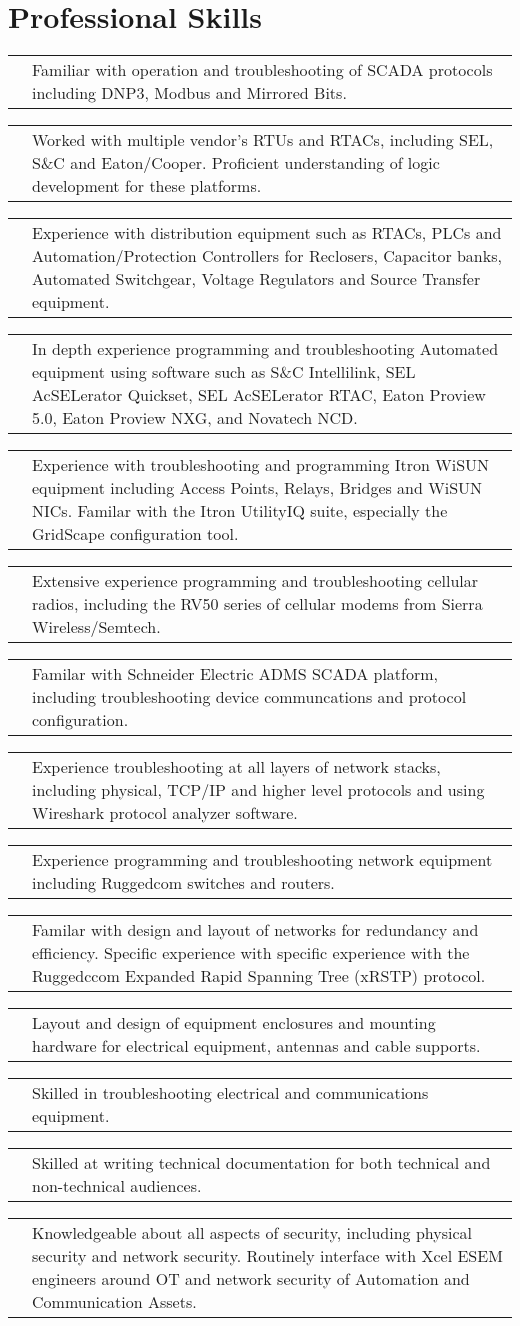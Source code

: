 \documentclass[11pt,letterpaper,sans]{moderncv}
\makeatletter
\newcommand*{\ccvitem}[3][.25em]{%
	\begin{tabular}{@{}m{\hintscolumnwidth}@{\hspace{\separatorcolumnwidth}}m{\maincolumnwidth}@{}}%
		\raggedleft\hintstyle{#2} &{#3}%
	\end{tabular}%
	\par\addvspace{#1}}
\makeatother
\begin{document}

\section{Professional Skills}
\ccvitem{Distribution Automation}{Familiar with operation and troubleshooting of SCADA protocols including DNP3, Modbus and Mirrored Bits.}
\ccvitem{Distribution Automation}{Worked with multiple vendor's RTUs and RTACs, including SEL, S\&C  and Eaton/Cooper.
	Proficient understanding of logic development for these platforms.}
\ccvitem{Distribution Automation}{Experience with distribution equipment such as RTACs, PLCs and
	Automation/Protection Controllers for Reclosers, Capacitor banks,
	Automated Switchgear, Voltage Regulators and Source Transfer equipment.}
\ccvitem{Distribution Automation}{In depth experience programming and troubleshooting Automated equipment
	using software such as S\&C Intellilink, SEL AcSELerator Quickset, SEL AcSELerator RTAC,
	Eaton Proview 5.0, Eaton Proview NXG, and Novatech NCD.}
\ccvitem{Radios and Communications}{Experience with troubleshooting and programming Itron WiSUN
	equipment including Access Points, Relays, Bridges and WiSUN NICs. Familar with
	the Itron UtilityIQ suite, especially the GridScape configuration tool.}
\ccvitem{Radios and Communications}{Extensive experience programming and troubleshooting cellular radios,
	including the RV50 series of cellular modems from Sierra Wireless/Semtech.}
\ccvitem{SCADA}{Familar with Schneider Electric ADMS SCADA platform, including troubleshooting device communcations and protocol configuration.}
\ccvitem{IT and Networking}{Experience troubleshooting at all layers of network stacks,
	including physical, TCP/IP and higher level protocols and using Wireshark protocol analyzer software.}
\ccvitem{IT and Networking}{Experience programming and troubleshooting network equipment including Ruggedcom switches and routers.}
\ccvitem{IT and Networking}{Familar with design and layout of networks for redundancy and efficiency. Specific experience
	with \newline specific experience with the Ruggedccom Expanded Rapid Spanning Tree (xRSTP) protocol.}
\ccvitem{Mechanical Design}{Layout and design of equipment enclosures and mounting hardware for electrical equipment, antennas and cable supports.}
\ccvitem{Troubleshooting}{Skilled in troubleshooting electrical and communications equipment.}
\ccvitem{Documentation}{Skilled at writing technical documentation for both technical and \newline non-technical audiences.}
\ccvitem{Systems Security}{Knowledgeable about all aspects of security, including physical security and network security.
		Routinely interface with Xcel ESEM engineers around OT and network security of Automation and Communication Assets.}
\end{document}
